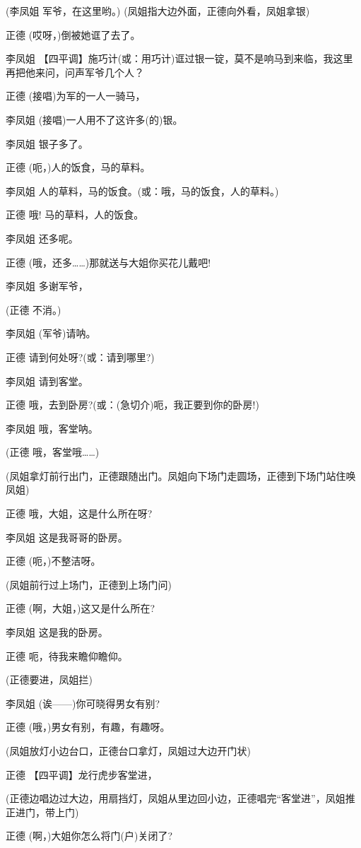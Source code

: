 (李凤姐 军爷，在这里哟。) (凤姐指大边外面，正德向外看，凤姐拿银)

正德 (哎呀，)倒被她诓了去了。

李凤姐
【四平调】施巧计(或：用巧计)诓过银一锭，莫不是响马到来临，我这里再把他来问，问声军爷几个人？

正德 (接唱)为军的一人一骑马，

李凤姐 (接唱)一人用不了这许多(的)银。

李凤姐 银子多了。

正德 (呃，)人的饭食，马的草料。

李凤姐 人的草料，马的饭食。(或：哦，马的饭食，人的草料。)

正德 哦! 马的草料，人的饭食。

李凤姐 还多呢。

正德 (哦，还多\ldots{}\ldots{})那就送与大姐你买花儿戴吧!

李凤姐 多谢军爷，

(正德 不消。)

李凤姐 (军爷)请呐。

正德 请到何处呀?(或：请到哪里?)

李凤姐 请到客堂。

正德 哦，去到卧房?(或：(急切介)呃，我正要到你的卧房!)

李凤姐 哦，客堂呐。

(正德 哦，客堂哦\ldots{}\ldots{})

(凤姐拿灯前行出门，正德跟随出门。凤姐向下场门走圆场，正德到下场门站住唤凤姐)

正德 哦，大姐，这是什么所在呀?

李凤姐 这是我哥哥的卧房。

正德 (呃，)不整洁呀。

(凤姐前行过上场门，正德到上场门问)

正德 (啊，大姐，)这又是什么所在?

李凤姐 这是我的卧房。

正德 呃，待我来瞻仰瞻仰。

(正德要进，凤姐拦)

李凤姐 (诶------)你可晓得男女有别?

正德 (哦，)男女有别，有趣，有趣呀。

(凤姐放灯小边台口，正德台口拿灯，凤姐过大边开门状)

正德 【四平调】龙行虎步客堂进，

(正德边唱边过大边，用扇挡灯，凤姐从里边回小边，正德唱完``客堂进''，凤姐推正进门，带上门)

正德 (啊，)大姐你怎么将门(户)关闭了?

